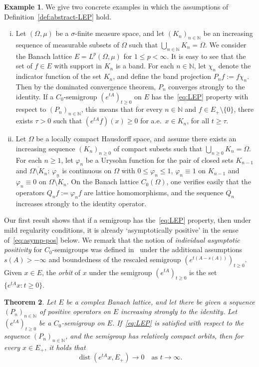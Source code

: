 \documentclass[a4paper, reqno]{amsart}
\numberwithin{equation}{section}
\theoremstyle{plain}
\newtheorem{theorem}{Theorem}[section]
\theoremstyle{definition}
\newtheorem{example}[theorem]{Example}
\theoremstyle{remark}
\DeclareMathOperator{\dist}{dist}
\newcommand{\NN}{\mathbb{N}}
\begin{document}
\begin{example}
\label{ex:abstract-LEP}
	We give two concrete examples in which the assumptions of Definition~\ref{def:abstract-LEP} hold.
	\begin{enumerate}[(i)]
	\item Let $(\Omega,\mu)$ be a $\sigma$-finite measure space, and let $(K_n)_{n\in\NN}$ be an increasing sequence of measurable subsets of $\Omega$ such that $\bigcup_{n\in\NN}K_n = \Omega$. We consider the Banach lattice $E=L^p(\Omega,\mu)$ for $1\le p<\infty$. It is easy to see that the set of $f\in E$ with support in $K_n$ is a band. For each $n\in\NN$, let $\chi_n$ denote the indicator function of the set $K_n$, and define the band projection $P_n f := f \chi_n$. Then by the dominated convergence theorem, $P_n$ converges strongly to the identity. If a $C_0$-semigroup $(e^{tA})_{t\ge 0}$ on $E$ has the~\eqref{eq:LEP} property with respect to $(P_n)_{n\in\NN}$, this means that for every $n\in\NN$ and $f\in E_+\setminus\{0\}$, there exists $\tau>0$ such that $(e^{tA}f)(x) \ge 0$ for a.e.\ $x\in K_n$, for all $t\ge\tau$.
	
	\item Let $\Omega$ be a locally compact Hausdorff space, and assume there exists an increasing sequence $(K_n)_{n\ge 0}$ of compact subsets such that $\bigcup_{n\ge 0}K_n=\Omega$. For each $n\ge 1$, let $\varphi_n$ be a Urysohn function for the pair of closed sets $K_{n-1}$ and $\overline{\Omega\setminus K_n}$: $\varphi_n$ is continuous on $\Omega$ with $0\le \varphi_n \le 1$, $\varphi_n \equiv 1$ on $K_{n-1}$ and $\varphi_n \equiv 0$ on $\overline{\Omega\setminus K_n}$. On the Banach lattice $C_0(\Omega)$, one verifies easily that the operators $Q_n f :=\varphi_n f$ are lattice homomorphisms, and the sequence $Q_n$ increases strongly to the identity operator.
	\end{enumerate}
\end{example}

Our first result shows that if a semigroup has the~\eqref{eq:LEP} property, then under mild regularity conditions, it is already `asymptotically positive' in the sense of~\eqref{eq:asymp-pos} below. We remark that the notion of \emph{individual asymptotic positivity} for $C_0$-semigroups was defined in~\cite[Definition 8.1]{DGK2} under the additional assumptions $s(A)>-\infty$ and boundedness of the rescaled semigroup $(e^{t(A-s(A))})_{t\ge 0}$. Given $x\in E$, the \emph{orbit} of $x$ under the semigroup $(e^{tA})_{t\ge 0}$ is the set $\{e^{tA}x : t \ge 0\}$.
\begin{theorem}
\label{thm:asymp-pos}
	Let $E$ be a complex Banach lattice, and let there be given a sequence $(P_n)_{n\in\NN}$ of positive operators on $E$ increasing strongly to the identity. Let $(e^{tA})_{t\ge 0}$ be a $C_0$-semigroup on $E$. If~\eqref{eq:LEP} is satisfied with respect to the sequence $(P_n)_{n\in\NN}$, and the semigroup has relatively compact orbits, then for every $x\in E_+$, it holds that
	\begin{equation}
	\label{eq:asymp-pos}
		\dist(e^{tA}x, E_+) \longrightarrow 0 \quad\text{as } t\to\infty.
	\end{equation}
\end{theorem}
\end{document}
